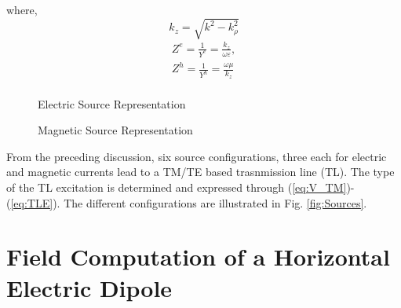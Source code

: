 \documentclass[11pt]{article}
\renewcommand{\O}{\omega}  %
\newcommand{\E}{\varepsilon}  %
\renewcommand{\u}{\mu}  %
\newcommand{\p}{\rho}  %
\renewcommand{\^}{\hat}  %
\begin{document}
  where,
  \begin{equation}
    k_z = \sqrt{k^2 - k_{\p}^2}
    \label{eq:k_z}
  \end{equation}
  \begin{equation}
    \begin{split}
      Z^e = \frac{1}{Y^e} = \frac{k_z}{\O \E},\\
      Z^h = \frac{1}{Y^h} = \frac{\O \u}{k_z}\\
    \end{split}
    \label{eq:Z}
  \end{equation}

  \begin{figure}[h]
    \centering
    \subfloat[]{
    \centering
    {}
    \label{fig:jx_source}
    }
    \newline
    \subfloat[]{
    \centering
    {}
    \label{fig:jy_source}
    }
    \newline
    \subfloat[]{ %
    \centering
    {}
    \label{fig:jz_source}
    }
    \newline
    \caption{Electric Source Representation}
    \label{fig:J_sources}
  \end{figure}

  \begin{figure}[h]
    \centering
    \subfloat[]{
    \centering
    {}
    \label{fig:mx_source}
    }
    \newline
    \subfloat[]{
    \centering
    {}
    \label{fig:my_source}
    }
    \newline
    \subfloat[]{ %
    \centering
    {}
    \label{fig:mz_source}
    }
    \newline
    \caption{Magnetic Source Representation}
    \label{fig:M_sources}
  \end{figure}
  From the preceding discussion, six source configurations, three each for electric and magnetic currents lead to a TM/TE based trasnmission line (TL). The type of the TL excitation is determined and expressed through (\ref{eq:V_TM})-(\ref{eq:TLE}). The different configurations are illustrated in Fig. \ref{fig:Sources}.

\section{Field Computation of a Horizontal Electric Dipole}
\end{document}
